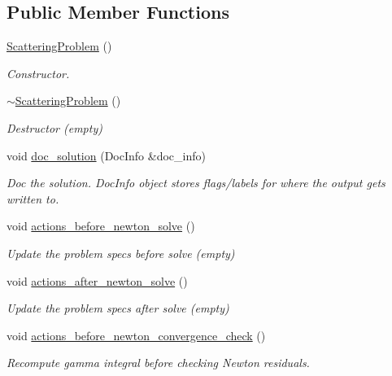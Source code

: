 \subsection*{Public Member Functions}
\begin{DoxyCompactItemize}
\item 
\hyperlink{classScatteringProblem_a94710f5d2ee52abc3df9dc8d1fd3eb71}{Scattering\+Problem} ()
\begin{DoxyCompactList}\small\item\em Constructor. \end{DoxyCompactList}\item 
\hyperlink{classScatteringProblem_a0a9838027d0286f22706fe6945bbac0a}{$\sim$\+Scattering\+Problem} ()
\begin{DoxyCompactList}\small\item\em Destructor (empty) \end{DoxyCompactList}\item 
void \hyperlink{classScatteringProblem_af83ab14c4f4750ea17c21466f6c6364f}{doc\+\_\+solution} (Doc\+Info \&doc\+\_\+info)
\begin{DoxyCompactList}\small\item\em Doc the solution. Doc\+Info object stores flags/labels for where the output gets written to. \end{DoxyCompactList}\item 
void \hyperlink{classScatteringProblem_a91ce14b928ec6edbb9d85515a310b1fb}{actions\+\_\+before\+\_\+newton\+\_\+solve} ()
\begin{DoxyCompactList}\small\item\em Update the problem specs before solve (empty) \end{DoxyCompactList}\item 
void \hyperlink{classScatteringProblem_abf1e7b97518c94e12802205dec08b15e}{actions\+\_\+after\+\_\+newton\+\_\+solve} ()
\begin{DoxyCompactList}\small\item\em Update the problem specs after solve (empty) \end{DoxyCompactList}\item 
void \hyperlink{classScatteringProblem_ad096c311ee474d23514656d2ba76a4b8}{actions\+\_\+before\+\_\+newton\+\_\+convergence\+\_\+check} ()
\begin{DoxyCompactList}\small\item\em Recompute gamma integral before checking Newton residuals. \end{DoxyCompactList}\item 

\end{DoxyCompactItemize}
